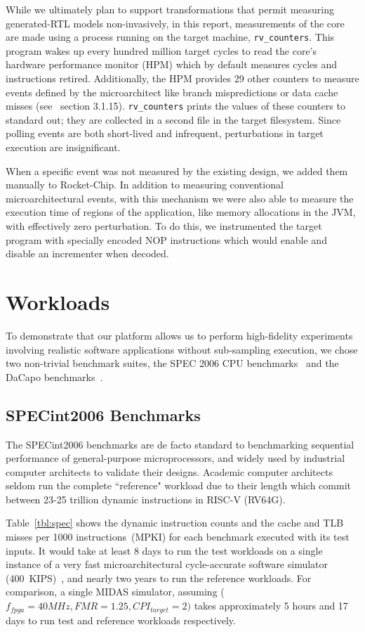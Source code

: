 While we ultimately plan to support transformations that permit
measuring generated-RTL models non-invasively, in this report,
measurements of the core are made using a process running on the target machine,
\texttt{rv\_counters}. This program wakes up every hundred million target
cycles to read the core's hardware performance monitor (HPM) which by default measures
cycles and instructions retired. Additionally, the HPM provides 29 other counters to measure
events defined by the microarchitect like branch mispredictions or data
cache misses (see~\cite{Waterman:EECS-2016-161} section 3.1.15).
\texttt{rv\_counters} prints the values of these counters to standard out; they are collected
in a second file in the target filesystem. Since polling events are both
short-lived and infrequent, perturbations in target execution are insignificant.

When a specific event was not measured by the existing design, we added them
manually to Rocket-Chip. In addition to measuring conventional
microarchitectural events, with this mechanism we were also able to measure the
execution time of regions of the application, like memory allocations in the
JVM, with effectively zero perturbation. To do this, we instrumented the target
program with specially encoded NOP instructions which would enable and disable
an incrementer when decoded.

\section{Workloads}

To demonstrate that our platform allows us to perform high-fidelity experiments
involving realistic software applications without sub-sampling execution, we
chose two non-trivial benchmark suites, the SPEC 2006 CPU
benchmarks~\cite{spec_cpu_2006} and the DaCapo benchmarks~\cite{dacapo}.

\subsection{SPECint2006 Benchmarks} The SPECint2006 benchmarks are de facto
standard to benchmarking sequential performance of general-purpose
microprocessors, and widely used by industrial computer architects to validate
their designs. Academic computer architects seldom run the complete
``reference" workload due to their length which commit between 23-25 trillion
dynamic instructions in RISC-V (RV64G).

Table~\ref{tbl:spec} shows the dynamic instruction counts and the cache and TLB
misses per 1000 instructions~(MPKI) for each benchmark executed with its test
inputs. It would take at least 8 days to run the test workloads on a single
instance of a very fast microarchitectural cycle-accurate software simulator
(400~KIPS)~\cite{marssx86}, and nearly two years to run the reference
workloads. For comparison, a single MIDAS simulator, assuming ($f_{fpga} = 40
MHz, FMR = 1.25, CPI_{target} = 2)$ takes approximately 5 hours and 17 days to
run test and reference workloads respectively.

